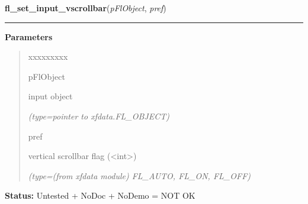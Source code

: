 \hspace{.8\funcindent}\begin{boxedminipage}{\funcwidth}

    \raggedright \textbf{fl\_set\_input\_vscrollbar}(\textit{pFlObject}, \textit{pref})

    \vspace{-1.5ex}

    \rule{\textwidth}{0.5\fboxrule}
\setlength{\parskip}{2ex}
\setlength{\parskip}{1ex}
      \textbf{Parameters}
      \vspace{-1ex}

      \begin{quote}
        \begin{Ventry}{xxxxxxxxx}

          \item[pFlObject]

          input object

            {\it (type=pointer to xfdata.FL\_OBJECT)}

          \item[pref]

          vertical scrollbar flag ({\textless}int{\textgreater})

            {\it (type=(from xfdata module) FL\_AUTO, FL\_ON, FL\_OFF)}

        \end{Ventry}

      \end{quote}

\textbf{Status:} Untested + NoDoc + NoDemo = NOT OK



    \end{boxedminipage}

    \label{xformslib:flinput:fl_set_input_topline}

    \vspace{0.5ex}

